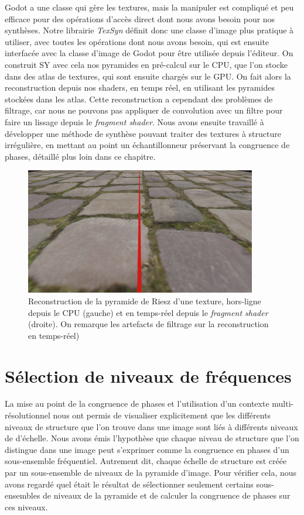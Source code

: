 Godot a une classe qui gère les textures, mais la manipuler est compliqué et peu efficace pour des opérations d'accès direct dont nous avons besoin pour nos synthèses. Notre librairie \textit{TexSyn} définit donc une classe d'image plus pratique à utiliser, avec toutes les opérations dont nous avons besoin, qui est ensuite interfacée avec la classe d'image de Godot pour être utilisée depuis l'éditeur. On construit SY avec cela nos pyramides en pré-calcul sur le CPU, que l'on stocke dans des atlas de textures, qui sont ensuite chargés sur le GPU. On fait alors la reconstruction depuis nos shaders, en temps réel, en utilisant les pyramides stockées dans les atlas. Cette reconstruction a cependant des problèmes de filtrage, car nous ne pouvons pas appliquer de convolution avec un filtre pour faire un lissage depuis le \textit{fragment shader}. Nous avons ensuite travaillé à développer une méthode de synthèse pouvant traiter des textures à structure irrégulière, en mettant au point un échantillonneur préservant la congruence de phases, détaillé plus loin dans ce chapitre.

\begin{figure}
    \centering
    \includegraphics[width=0.9\textwidth]{contenu/resources/images/reconstruction_cpu_vs_gpu}
    \caption[Reconstruction de texture dans \textit{TexSyn}]{Reconstruction de la pyramide de Riesz d'une texture, hors-ligne depuis le CPU (gauche) et en temps-réel depuis le \textit{fragment shader} (droite). On remarque les artefacts de filtrage sur la reconstruction en temps-réel)}
    \label{fig:texsyn-reconstruction}
\end{figure}


\section{Sélection de niveaux de fréquences}

La mise au point de la congruence de phases et l'utilisation d'un contexte multi-résolutionnel nous ont permis de visualiser explicitement que les différents niveaux de structure que l'on trouve dans une image sont liés à différents niveaux de d'échelle. Nous avons émis l'hypothèse que chaque niveau de structure que l'on distingue dans une image peut s'exprimer comme la congruence en phases d'un sous-ensemble fréquentiel. Autrement dit, chaque échelle de structure est créée par un sous-ensemble de niveaux de la pyramide d'image. Pour vérifier cela, nous avons regardé quel était le résultat de sélectionner seulement certains sous-ensembles de niveaux de la pyramide et de calculer la congruence de phases sur ces niveaux.

